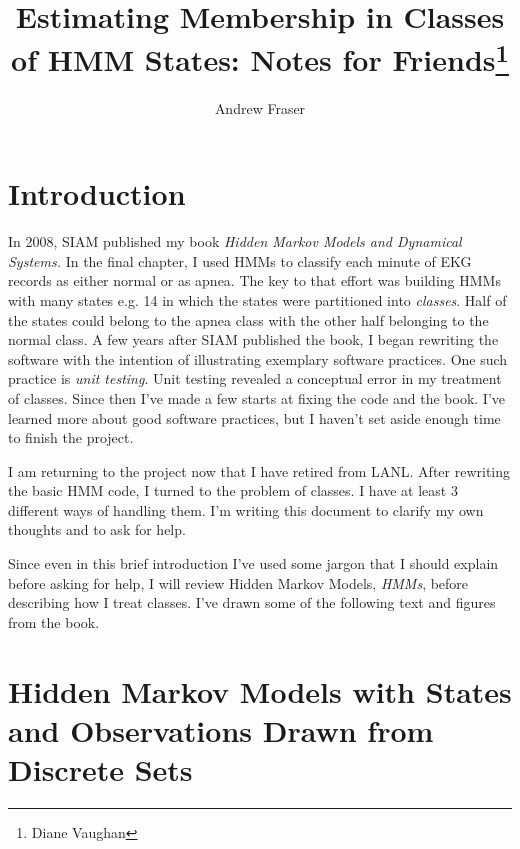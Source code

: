 \documentclass[]{article}
\title{Estimating Membership in Classes of HMM States: Notes for
  Friends\footnote{Diane Vaughan}}
\author{Andrew Fraser}
\newcommand{\eg}{e.g.\xspace}
\begin{document}
\maketitle

\section{Introduction}\label{sec:introduction}

In 2008, SIAM published my book \emph{Hidden Markov Models and
  Dynamical Systems.}  In the final chapter, I used HMMs to classify
each minute of EKG records as either normal or as apnea.  The key to
that effort was building HMMs with many states \eg 14 in which the
states were partitioned into \emph{classes}.  Half of the states could
belong to the apnea class with the other half belonging to the normal
class.  A few years after SIAM published the book, I began rewriting
the software with the intention of illustrating exemplary software
practices.  One such practice is \emph{unit testing}.  Unit testing
revealed a conceptual error in my treatment of classes.  Since then
I've made a few starts at fixing the code and the book.  I've learned
more about good software practices, but I haven't set aside enough
time to finish the project.

I am returning to the project now that I have retired from LANL.\@
After rewriting the basic HMM code, I turned to the problem of
classes.  I have at least 3 different ways of handling them.  I'm
writing this document to clarify my own thoughts and to ask for help.

Since even in this brief introduction I've used some jargon that I
should explain before asking for help, I will review Hidden Markov
Models, \emph{HMMs}, before describing how I treat classes.  I've
drawn some of the following text and figures from the book.

\section{Hidden Markov Models with States and Observations Drawn from
  Discrete Sets}\label{sec:hmms}
\end{document}
